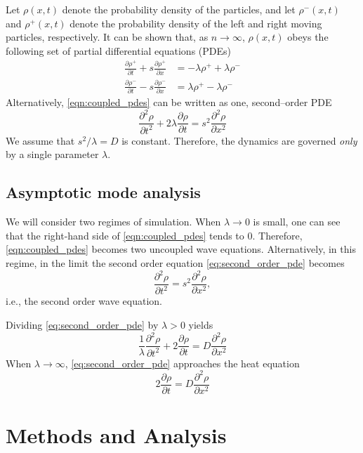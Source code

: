 \documentclass[prl,preprint]{revtex4-1}
\begin{document}
Let $\rho(x, t)$ denote the probability density of the particles, and let $\rho^-(x, t)$ and $\rho^+(x, t)$ denote the probability density of the left and right moving particles, respectively.
%
It can be shown that, as $n \rightarrow \infty$, $\rho(x, t)$ obeys the following set of partial differential equations (PDEs)
\begin{eqnarray} \label{eqn:coupled_pdes}
\frac{\partial \rho^+}{\partial t} + s \frac{\partial \rho^+}{\partial x} & = -\lambda \rho^+ +\lambda \rho^- \\
\frac{\partial \rho^-}{\partial t} - s \frac{\partial \rho^-}{\partial x} & = \lambda \rho^+ -\lambda \rho^- 
\end{eqnarray}
%
Alternatively, \eqref{eqn:coupled_pdes} can be written as one, second--order PDE
\begin{equation} \label{eq:second_order_pde}
\frac{\partial^2 \rho}{\partial t^2} + 2 \lambda \frac{\partial \rho}{\partial t} = s^2 \frac{\partial ^2 \rho}{\partial x^2}
\end{equation}
%
We assume that $s^2/\lambda = D$ is constant.
%
Therefore, the dynamics are governed {\em only} by a single parameter $\lambda$.

\subsection{Asymptotic mode analysis}  \label{subsec:mode_analysis}

We will consider two regimes of simulation.
%
When $\lambda \rightarrow 0$ is small, one can see that the right-hand side of \eqref{eqn:coupled_pdes} tends to 0. 
%
Therefore, \eqref{eqn:coupled_pdes} becomes two uncoupled wave equations.
%
Alternatively, in this regime, in the limit the second order equation \eqref{eq:second_order_pde} becomes 
\[
\frac{\partial^2 \rho}{\partial t^2} = s^2 \frac{\partial ^2 \rho}{\partial x^2},
\]
i.e., the second order wave equation.

Dividing \eqref{eq:second_order_pde} by $\lambda > 0$ yields
\[
\frac{1}{\lambda} \frac{\partial^2 \rho}{\partial t^2} + 2 \frac{\partial \rho}{\partial t} = D \frac{\partial ^2 \rho}{\partial x^2}
\]
When $\lambda \rightarrow \infty$, \eqref{eq:second_order_pde} approaches the heat equation
\[
2 \frac{\partial \rho}{\partial t} = D \frac{\partial ^2 \rho}{\partial x^2}
\]
 
\section{Methods and Analysis}
\end{document}
